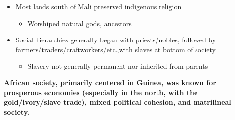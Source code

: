 \documentclass[a4paper]{article}
\begin{document}
{\begin{itemize}
\begin{itemize}
\begin{itemize}
                            \item Role of chief often passed on to son of chief's eldest sister
                        \end{itemize}
                        \item Most lands south of Mali preserved indigenous religion
                        \begin{itemize}
                            \item Worshiped natural gods, ancestors
                        \end{itemize}
                        \item Social hierarchies generally began with priests/nobles, followed by farmers/traders/craftworkers/etc.,with slaves at bottom of society 
                        \begin{itemize}
                            \item Slavery not generally permanent nor inherited from parents
                        \end{itemize}
                    \end{itemize}
                \end{itemize}
                \textbf{African society, primarily centered in Guinea, was known for prosperous economies (especially in the north, with the gold/ivory/slave trade), mixed political cohesion, and matrilineal society.}
        }
\end{document}
